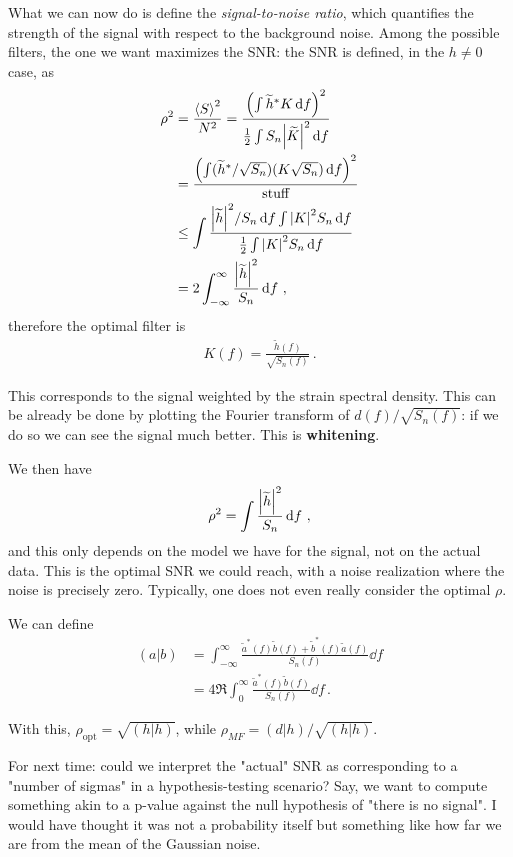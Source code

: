 \documentclass[main.tex]{subfiles}
\begin{document}
What we can now do is define the \emph{signal-to-noise ratio}, which quantifies the strength of the signal with respect to the background noise.
Among the possible filters, the one we want maximizes the SNR: the SNR is defined, in the \(h \neq 0\) case, as
%
\begin{align}
\rho^2 &= \frac{\expval{S}^2}{N^2} =
 \frac{\qty(\int \widetilde{h}^{*} K \dd{f})^2}{ \frac{1}{2} \int S_n \abs{\widetilde{K}}^2 \dd{f}}
  \\
 &= \frac{ \qty( \int (\widetilde{h}^{*} / \sqrt{S_n}) (K \sqrt{S_n}) \dd{f})^2 }{\text{stuff}}  \\
 &\leq \int \frac{\abs{\widetilde{h}}^2 / S_n \dd{f} \int \abs{K}^2 S_n\dd{f}}{ \frac{1}{2}\int \abs{K}^2 S_n \dd{f}}  \\
 &= 2 \int_{- \infty }^{\infty } \frac{\abs{\widetilde{h}}^2}{S_n} \dd{f}
\,,
\end{align}
%
therefore the optimal filter is 
%
\begin{align}
K(f) = \frac{\widetilde{h}(f)}{\sqrt{S_n(f)}}
\,.
\end{align}

This corresponds to the signal weighted by the strain spectral density. This can be already be done by plotting the Fourier transform of \(d(f) /\sqrt{S_n(f)} \): if we do so we can see the signal much better.
This is \textbf{whitening}. 

We then have 
%
\begin{align}
\rho^2 = \int \frac{\abs{\widetilde{h}}^2}{S_n} \dd{f}
\,,
\end{align}
%
and this only depends on the model we have for the signal, not on the actual data. 
This is the optimal SNR we could reach, with a noise realization where the noise is precisely zero.
Typically, one does not even really consider the optimal \(\rho \).



We can define 
%
\begin{align}
(a|b) &= \int_{- \infty }^{\infty } \frac{\widetilde{a}^{*}(f) \widetilde{b}(f) + \widetilde{b}^{*}(f) \widetilde{a}(f)}{S_n(f)} \dd{f}  \\
&= 4 \Re \int_{0}^{\infty } \frac{\widetilde{a}^{*}(f) \widetilde{b}(f)}{S_n(f)} \dd{f}
\,.
\end{align}

With this, \(\rho_{\text{opt}} = \sqrt{(h| h)}\), while \(\rho_{MF} = (d|h) / \sqrt{(h|h)}\). 

For next time: could we interpret the "actual" SNR as corresponding to a "number of sigmas" in a hypothesis-testing scenario? Say, we want to compute something akin to a p-value against the null hypothesis of "there is no signal".
I would have thought it was not a probability itself but something like how far we are from the mean of the Gaussian noise.
\end{document}
